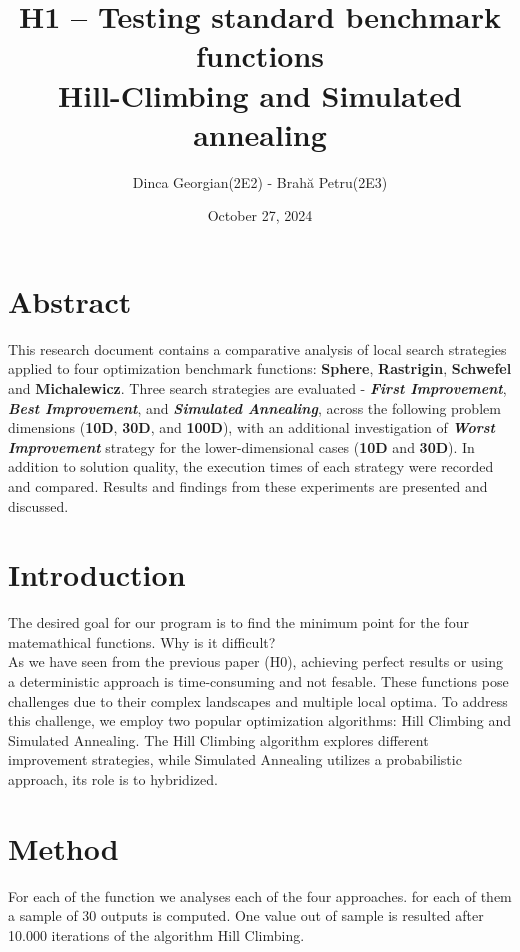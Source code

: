 \documentclass{article}
\title{H1 – Testing standard benchmark functions \\ Hill-Climbing and Simulated annealing}
\author{Dinca Georgian(2E2) - Brahă Petru(2E3)}
\date{October 27, 2024}
\begin{document}
\maketitle

\section{Abstract}

This research document contains a comparative analysis of local search strategies applied to four optimization benchmark functions: \textbf{Sphere}, \textbf{Rastrigin}, \textbf{Schwefel} and \textbf{Michalewicz}. Three search strategies are evaluated - \textit{\textbf{First Improvement}}, \textit{\textbf{Best Improvement}}, and \textit{\textbf{Simulated Annealing}}, across the following problem dimensions (\textbf{10D}, \textbf{30D}, and \textbf{100D}), with an additional investigation of \textit{\textbf{Worst Improvement}} strategy for the lower-dimensional cases (\textbf{10D} and \textbf{30D}). In addition to solution quality, the execution times of each strategy were recorded and compared. Results and findings from these experiments are presented and discussed.


\section{Introduction}

The desired goal for our program is to find the minimum point for the four matemathical functions. Why is it difficult?\\
As we have seen from the previous paper (H0), achieving perfect results or using a deterministic approach is time-consuming and not fesable. These functions pose challenges due to their complex landscapes and multiple local optima. To address this challenge, we employ two popular optimization algorithms: Hill Climbing and Simulated Annealing. The Hill Climbing algorithm explores different improvement strategies, while Simulated Annealing utilizes a probabilistic approach, its role is to hybridized.


\section{Method}

For each of the function we analyses each of the four approaches. for each of them a sample of 30 outputs is computed. One value out of sample is resulted after 10.000 iterations of the algorithm Hill Climbing. 
\end{document}
